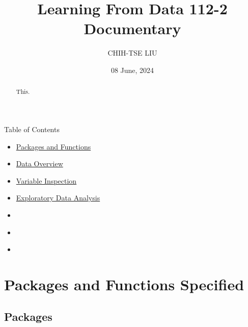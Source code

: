 \documentclass[
  12pt,
]{article}
\title{Learning From Data 112-2 Documentary}
\author{CHIH-TSE LIU}
\date{08 June, 2024}
\begin{document}
\maketitle
\begin{abstract}
This.
\end{abstract}

\begin{center}
Table of Contents 
\label{sec:TOP}
\begin{itemize}
\item \hyperref[sec:PRE]{Packages and Functions}
\item \hyperref[sec:DAT]{Data Overview}
\item \hyperref[sec:VAR]{Variable Inspection}
\item \hyperref[sec:EDA]{Exploratory Data Analysis}
\item \hyperref[sec:]{}
\item \hyperref[sec:]{}
\item \hyperref[sec:]{}
\end{itemize}

\end{center}

\thispagestyle{empty} 
\clearpage
{}



\newpage
\section{Packages and Functions Specified}
\label{sec:PRE}
\hypertarget{sec:PRE}{}

\subsection{Packages}\label{packages}
\end{document}
